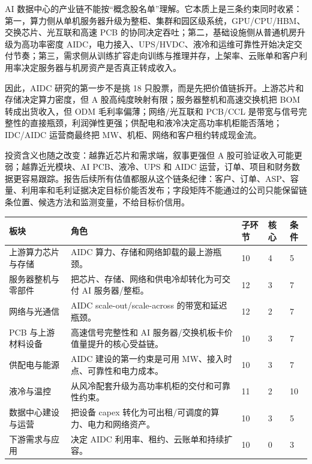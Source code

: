 AI 数据中心的产业链不能按“概念股名单”理解。它本质上是三条约束同时收紧：第一，算力侧从单机服务器升级为整柜、集群和园区级系统，GPU/CPU/HBM、交换芯片、光互联和高速 PCB 的协同决定吞吐；第二，基础设施侧从普通机房升级为高功率密度 AIDC，电力接入、UPS/HVDC、液冷和运维可靠性开始决定交付节奏；第三，需求侧从训练扩容走向训练与推理并存，上架率、云账单和客户利用率决定服务器与机房资产是否真正转成收入。

因此，AIDC 研究的第一步不是挑 18 只股票，而是先把价值链拆开。上游芯片和存储决定算力密度，但 A 股高纯度映射有限；服务器整机和高速交换机把 BOM 转成出货收入，但 ODM 毛利率偏薄；网络/光互联和 PCB/CCL 是带宽与信号完整性的直接瓶颈，利润弹性更强；供配电和液冷决定高功率机柜能否落地；IDC/AIDC 运营商最终把 MW、机柜、网络和客户租约转成现金流。

	投资含义也随之改变：越靠近芯片和需求端，叙事更强但 A 股可验证收入可能更弱；越靠近光模块、AI PCB、液冷、UPS 和 AIDC 运营，订单、项目和财务数据更容易跟踪。报告后续所有估值都服从这个链条纪律：客户、订单、ASP、容量、利用率和毛利证据决定目标价能否发布；字段矩阵不能通过的公司只能保留链条位置、候选方法和监测变量，不给目标价信用。

\begin{exhibitbox}
\scriptsize
\begin{tabularx}{\textwidth}{L{3.0cm}X R{1.3cm}R{1.3cm}R{1.4cm}}
\toprule
\textbf{板块} & \textbf{角色} & \textbf{子环节} & \textbf{核心} & \textbf{条件}\\
\midrule
上游算力芯片与存储 & AIDC 算力、存储和网络卸载的最上游瓶颈。 & 10 & 4 & 5\\
服务器整机与零部件 & 把芯片、存储、网络和供电冷却转化为可交付 AI 服务器/整柜。 & 12 & 3 & 7\\
网络与光通信 & AIDC scale-out/scale-across 的带宽和延迟瓶颈。 & 12 & 2 & 7\\
PCB 与上游材料设备 & 高速信号完整性和 AI 服务器/交换机板卡价值量提升的核心受益链。 & 10 & 3 & 7\\
供配电与能源 & AIDC 建设的第一约束是可用 MW、接入时点、可靠性和电力成本。 & 10 & 3 & 7\\
液冷与温控 & 从风冷配套升级为高功率机柜的交付和可靠性约束。 & 11 & 2 & 10\\
数据中心建设与运营 & 把设备 capex 转化为可出租/可调度的算力、电力和网络资产。 & 10 & 3 & 5\\
下游需求与应用 & 决定 AIDC 利用率、租约、云账单和持续扩容。 & 10 & 0 & 3\\
\bottomrule
\end{tabularx}
\end{exhibitbox}


